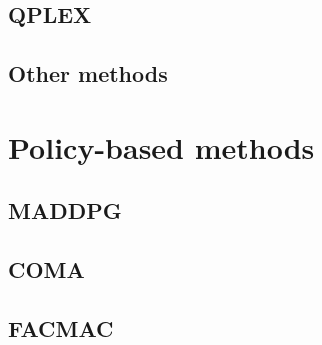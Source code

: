 \subsection{QPLEX}

\subsection{Other methods}

\section{Policy-based methods}
\label{sec:ch3_policy}
\subsection{MADDPG}
\subsection{COMA}
\subsection{FACMAC}


